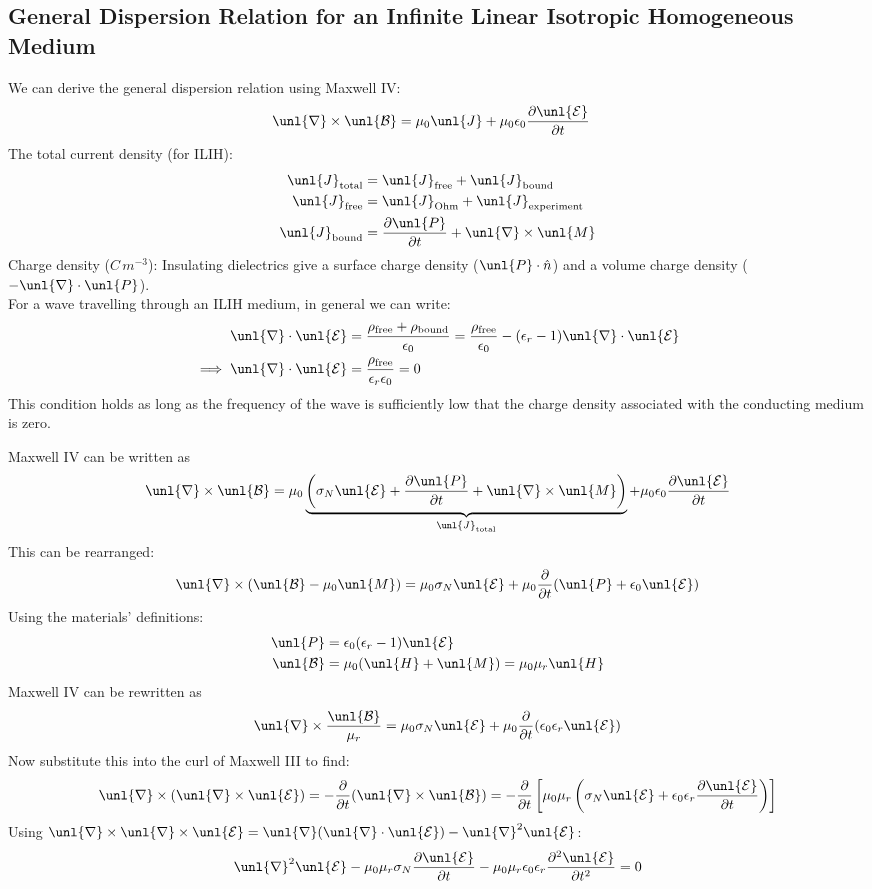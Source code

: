 \documentclass[a4paper, 11pt, normalem]{report}
\newcommand\p{\partial}
\newcommand\E{\mathcal{E}}
\newcommand\uE{\unl{\E}}
\newcommand\B{\mathcal{B}}
\newcommand\uB{\unl{\B}}
\newcommand\del{\unl{\nabla}}
\newcommand\eno{\epsilon_0}
\newcommand\hn{\hat{n}}
\newcommand\J{\unl{J}}
\newcommand\M{\unl{M}}
\newcommand\er{\epsilon_r}
\begin{document}
\subsection{General Dispersion Relation for an Infinite Linear Isotropic Homogeneous Medium}
We can derive the general dispersion relation using Maxwell \RN{4}:
\begin{align}
    \del\times\uB &= \mu_0\J + \mu_0\eno\frac{\p\uE}{\p t}
\end{align}
The total current density (for ILIH):
\begin{align}
    \J_{\text{total}} &= \J_{\text{free}} + \J_{\text{bound}} \\
    \J_{\text{free}} &= \J_{\text{Ohm}} + \J_{\text{experiment}} \\
    \J_{\text{bound}} &= \frac{\p \unl{P}}{\p t} + \del\times\M
\end{align}
Charge density ($C\,m^{-3}$): Insulating dielectrics give a surface charge density ($\unl{P}\cdot\hn$) and a volume charge density ($-\del\cdot\unl{P}$).\\
For a wave travelling through an ILIH medium, in general we can write:
\begin{align}
    \del\cdot\uE &= \frac{\rho_{\text{free}}+\rho_{\text{bound}}}{\eno} = \frac{\rho_{\text{free}}}{\eno} - (\er - 1)\del\cdot\uE \\
    \implies \del\cdot\uE &= \frac{\rho_{\text{free}}}{\er\eno} = 0
\end{align}
This condition holds as long as the frequency of the wave is sufficiently low that the charge density associated with the conducting medium is zero.

Maxwell \RN{4} can be written as
\begin{equation}
    \del\times\uB = \mu_0\underbrace{\left(\sigma_N \uE + \frac{\p \unl{P}}{\p t} + \del\times\M\right)}_{\J_{\text{total}}} + \mu_0\eno\frac{\p \uE}{\p t}
\end{equation}
This can be rearranged:
\begin{align}
    \del\times(\uB - \mu_0\M) = \mu_0\sigma_N\uE + \mu_0\frac{\p}{\p t}(\unl{P} + \eno\uE)
\end{align}
Using the materials' definitions:
\begin{align}
    \unl{P} &= \eno(\er - 1)\uE \\
    \uB &= \mu_0(\unl{H}+\M) = \mu_0\mu_r\unl{H}
\end{align}
Maxwell \RN{4} can be rewritten as
\begin{equation}
    \del\times\frac{\uB}{\mu_r} = \mu_0\sigma_N\uE + \mu_0\frac{\p}{\p t} (\eno\er\uE)
\end{equation}
Now substitute this into the curl of Maxwell \RN{3} to find:
\begin{align}
    \del\times(\del\times\uE) = -\frac{\p}{\p t}(\del\times\uB) = -\frac{\p}{\p t}\left[\mu_0\mu_r\left(\sigma_N\uE + \eno\er\frac{\p \uE}{\p t}\right)\right]
\end{align}
Using $\del\times\del\times\uE = \del(\del\cdot\uE) - \del^2\uE$:
\begin{align}
    \del^2\uE - \mu_0\mu_r\sigma_N\frac{\p \uE}{\p t} - \mu_0\mu_r\eno\er\frac{\p^2\uE}{\p t^2} = 0
\end{align}
\end{document}
